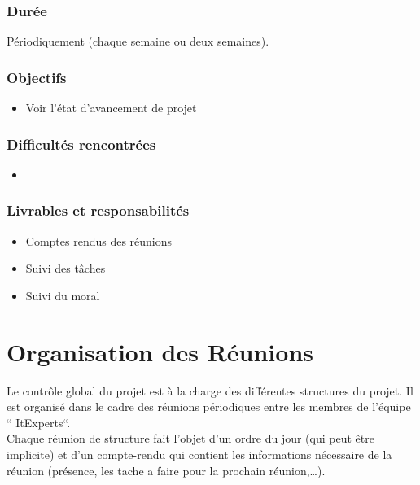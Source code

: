 \documentclass[11pt,fleqn]{book} %
\begin{document}
\subsubsection{Durée}
Périodiquement (chaque semaine ou deux semaines).
 \subsubsection{Objectifs}
\begin{itemize}
    \item  Voir l’état d’avancement de projet
\end{itemize}
\subsubsection{Difficultés rencontrées}
\begin{itemize}
    \item 
\end{itemize}
\subsubsection{Livrables et responsabilités}
\begin{itemize}
    \item Comptes rendus des réunions 
    \item  Suivi des tâches
    \item Suivi du moral 
\end{itemize}

\section{Organisation des Réunions}
Le contrôle global du projet est à la charge des différentes structures du projet. Il est organisé dans le cadre des réunions périodiques entre les membres de l’équipe “ ItExperts“.\\ 
Chaque réunion de structure fait l’objet d’un ordre du jour (qui peut être implicite) et d’un compte-rendu qui contient les informations nécessaire de la réunion (présence, les tache a faire pour la prochain réunion,…).
\end{document}
